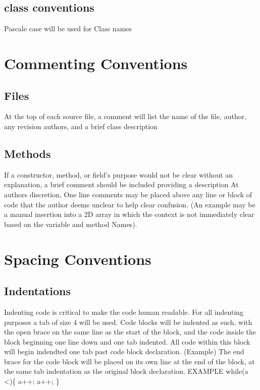 \documentclass{article}
\begin{document}
\subsection{class conventions}
Pascale case will be used for Class names
\section{Commenting Conventions}
\subsection{Files}
At the top of each source file, a comment will list the name of the file, author, any revision authors, and a brief class description 
\subsection{Methods}
If a constructor, method, or field’s purpose would not be clear without an explanation, a brief comment should be included providing a description
\newline
At authors discretion, One line comments may be placed above any line or block of code that the author deems unclear to help clear confusion. (An example may be a manual insertion into a 2D array in which the context is not immediately clear based on the variable and method Names).

\section{Spacing Conventions} 

\subsection{Indentations}
Indenting code is critical to make the code human readable. 
\newline 
\newline
For all indenting purposes a tab of size 4 will be used.
\newline 
\newline
Code blocks will be indented as such, with the open brace on the same line as the start of the block, and the code inside the block beginning one line down and one tab indented. All code within this block will begin indendted one tab past code block declaration. (Example) The end brace for the code block will be placed on its own line at the end of the block, at the same tab indentation as the original block declaration. EXAMPLE
\newline 
while(a \textless {})\{ \newline
	\hspace*{1cm}a++;\newline
	\hspace*{1cm}a++; \newline
\}
\end{document}
